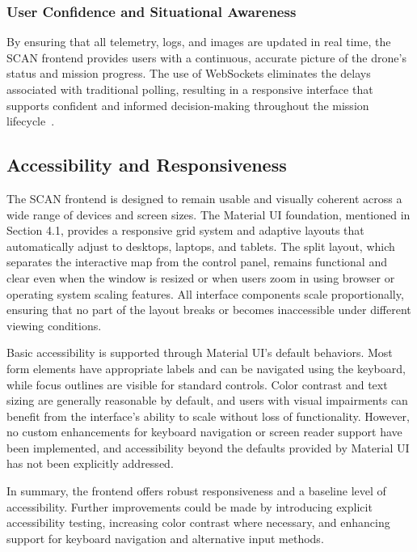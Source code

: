 \subsubsection{User Confidence and Situational Awareness}
By ensuring that all telemetry, logs, and images are updated in real time, the SCAN frontend provides users with a continuous, accurate picture of the drone’s status and mission progress. 
The use of WebSockets eliminates the delays associated with traditional polling, resulting in a responsive interface that supports confident and informed decision-making throughout the mission lifecycle~\cite{syncfusion_ws}.

\subsection{Accessibility and Responsiveness}
\label{sec:accessibility-responsiveness}

The SCAN frontend is designed to remain usable and visually coherent across a wide range of devices and screen sizes. The Material UI foundation, mentioned in Section 4.1, provides a responsive grid system and adaptive layouts that automatically adjust to desktops, laptops, and tablets. The split layout, which separates the interactive map from the control panel, remains functional and clear even when the window is resized or when users zoom in using browser or operating system scaling features. All interface components scale proportionally, ensuring that no part of the layout breaks or becomes inaccessible under different viewing conditions.

Basic accessibility is supported through Material UI’s default behaviors. Most form elements have appropriate labels and can be navigated using the keyboard, while focus outlines are visible for standard controls. Color contrast and text sizing are generally reasonable by default, and users with visual impairments can benefit from the interface’s ability to scale without loss of functionality. However, no custom enhancements for keyboard navigation or screen reader support have been implemented, and accessibility beyond the defaults provided by Material UI has not been explicitly addressed.

In summary, the frontend offers robust responsiveness and a baseline level of accessibility. Further improvements could be made by introducing explicit accessibility testing, increasing color contrast where necessary, and enhancing support for keyboard navigation and alternative input methods.

